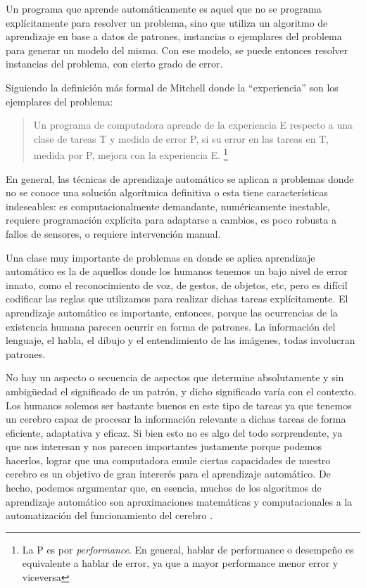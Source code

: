 
Un programa que aprende automáticamente es aquel que no se programa explícitamente para resolver un problema, sino que utiliza un algoritmo de aprendizaje en base a datos de patrones, instancias o ejemplares del problema para generar un modelo del mismo. Con ese modelo, se puede entonces resolver instancias del problema, con cierto grado de error. 

Siguiendo la definición más formal de Mitchell \cite{mitchell1997} donde la ``experiencia'' son los ejemplares del problema:

\begin{quote} Un programa de computadora aprende de la experiencia E respecto a una clase de tareas T y medida de error P, si su error en las tareas en T, medida por P, mejora con la experiencia E. \footnote{La P es por \textit{performance}. En general, hablar de performance o desempeño es equivalente a hablar de error, ya que a mayor performance menor error y viceversa} \end{quote}

En general, las técnicas de aprendizaje automático se aplican a problemas donde no se conoce una solución algorítmica definitiva o esta tiene características indeseables: es computacionalmente demandante, numéricamente inestable, requiere programación explícita para adaptarse a cambios, es poco robusta a fallos de sensores, o requiere intervención manual. 

Una clase muy importante de problemas en donde se aplica aprendizaje automático es la de aquellos donde los humanos tenemos un bajo nivel de error innato, como el reconocimiento de voz, de gestos, de objetos, etc, pero es difícil codificar las reglas que utilizamos para realizar dichas tareas explícitamente. El aprendizaje automático es importante, entonces, porque las ocurrencias de la existencia humana parecen ocurrir en forma de patrones. La información del lenguaje, el habla, el dibujo y el entendimiento de las imágenes, todas involucran patrones. 

No hay un aspecto o secuencia de aspectos que determine absolutamente y sin ambigüedad el significado de un patrón, y dicho significado varía con el contexto. Los humanos solemos ser bastante buenos en este tipo de tareas ya que tenemos un cerebro capaz de procesar la información relevante a dichas tareas de forma eficiente, adaptativa y eficaz. Si bien esto no es algo del todo sorprendente, ya que nos interesan y nos parecen importantes justamente porque podemos hacerlos, lograr que una computadora emule ciertas capacidades de nuestro cerebro es un objetivo de gran intererés para el aprendizaje automático. De hecho, podemos argumentar que, en esencia, muchos de los algoritmos de aprendizaje automático son aproximaciones matemáticas y computacionales a la automatización del funcionamiento del cerebro \cite{shannon1953,meltzoff2009,lioutikov2012}.

